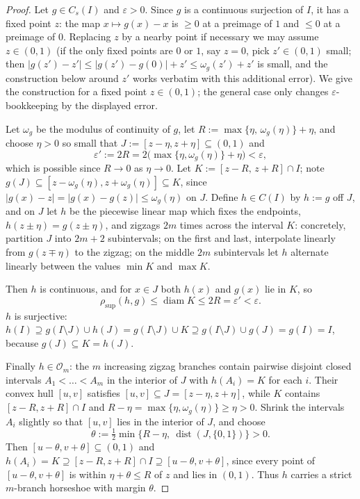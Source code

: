 \documentclass[11pt]{article}
\newcommand{\I}{I}
\newcommand{\Cs}{C_s(\I)}
\newcommand{\rsup}{\rho_{\sup}}
\begin{document}
\begin{proof}
Let $g\in\Cs$ and $\varepsilon>0$.  Since $g$ is a continuous surjection of $\I$,
it has a fixed point $z$: the map $x\mapsto g(x)-x$ is $\ge0$ at a preimage of $1$
and $\le0$ at a preimage of $0$.  Replacing $z$ by a nearby point if necessary we
may assume $z\in(0,1)$ (if the only fixed points are $0$ or $1$, say $z=0$, pick
$z'\in(0,1)$ small; then $|g(z')-z'|\le|g(z')-g(0)|+z'\le\omega_g(z')+z'$ is small,
and the construction below around $z'$ works verbatim with this additional error).
We give the construction for a fixed point $z\in(0,1)$; the general case only
changes $\varepsilon$-bookkeeping by the displayed error.

Let $\omega_g$ be the modulus of continuity of $g$, let
$R:=\max\{\eta,\,\omega_g(\eta)\}+\eta$, and choose $\eta>0$ so small
that $J:=[z-\eta,z+\eta]\subseteq(0,1)$ and
\[
\varepsilon':=2R=2\bigl(\max\{\eta,\omega_g(\eta)\}+\eta\bigr)<\varepsilon,
\]
which is possible since $R\to0$ as $\eta\to0$.  Let
$K:=[z-R,\,z+R]\cap\I$; note $g(J)\subseteq[z-\omega_g(\eta),z+\omega_g(\eta)]
\subseteq K$, since $|g(x)-z|=|g(x)-g(z)|\le\omega_g(\eta)$ on $J$.  Define
$h\in C(\I)$ by $h:=g$ off $J$, and on $J$ let $h$ be the piecewise linear map
which fixes the endpoints, $h(z\pm\eta)=g(z\pm\eta)$, and zigzags $2m$ times across
the interval $K$: concretely, partition $J$ into $2m+2$ subintervals; on the first
and last, interpolate linearly from $g(z\mp\eta)$ to the zigzag; on the middle
$2m$ subintervals let $h$ alternate linearly between the values
$\min K$ and $\max K$.

Then $h$ is continuous, and for $x\in J$ both $h(x)$ and $g(x)$ lie in $K$, so
\[
\rsup(h,g)\le\operatorname{diam}K\le2R=\varepsilon'<\varepsilon .
\]
$h$ is surjective: $h(\I)\supseteq g(\I\setminus J)\cup h(J)
=g(\I\setminus J)\cup K\supseteq g(\I\setminus J)\cup g(J)=g(\I)=\I$,
because $g(J)\subseteq K=h(J)$.

Finally $h\in\mathcal O_m$: the $m$ increasing zigzag branches contain pairwise
disjoint closed intervals $A_1<\dots<A_m$ in the interior of $J$ with
$h(A_i)=K$ for each $i$.  Their convex hull $[u,v]$ satisfies
$[u,v]\subseteq J=[z-\eta,z+\eta]$, while $K$ contains
$[z-R,z+R]\cap\I$ and $R-\eta=\max\{\eta,\omega_g(\eta)\}\ge\eta>0$.  Shrink the
intervals $A_i$ slightly so that $[u,v]$ lies in the interior of $J$, and choose
\[
\theta:=\tfrac12\min\bigl\{R-\eta,\ \operatorname{dist}(J,\{0,1\})\bigr\}>0 .
\]
Then $[u-\theta,v+\theta]\subseteq(0,1)$ and
$h(A_i)=K\supseteq[z-R,z+R]\cap\I\supseteq[u-\theta,v+\theta]$, since every point
of $[u-\theta,v+\theta]$ is within $\eta+\theta\le R$ of $z$ and lies in $(0,1)$.
Thus $h$ carries a strict $m$-branch horseshoe with margin $\theta$.
\end{proof}
\end{document}
